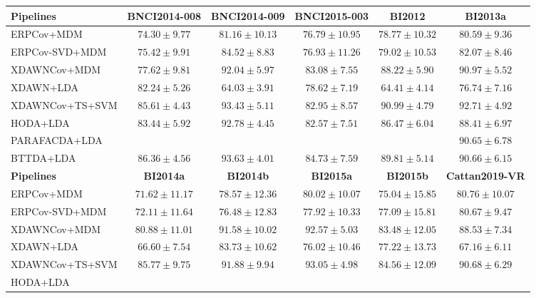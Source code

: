 \begin{tabularx}{\textwidth}{@{}Xccccc@{}}
\toprule
\textbf{Pipelines}            & \textbf{BNCI2014-008} & \textbf{BNCI2014-009}
                              & \textbf{BNCI2015-003} & \textbf{BI2012} &
                              \textbf{BI2013a}\\
\midrule
ERPCov+MDM            & $74.30\pm9.77$ & $81.16\pm10.13$ & $76.79\pm10.95$ &
$78.77\pm10.32$ & $80.59\pm9.36$ \\
ERPCov-SVD+MDM  & $75.42\pm9.91$ & $84.52\pm8.83$ & $76.93\pm11.26$ &
$79.02\pm10.53$ & $82.07\pm8.46$ \\
XDAWNCov+MDM          & $77.62\pm9.81$ & $92.04\pm5.97$ & $83.08\pm7.55$ &
$88.22\pm5.90$ & $90.97\pm5.52$ \\
XDAWN+LDA             & $82.24\pm5.26$ & $64.03\pm3.91$ & $78.62\pm7.19$ &
$64.41\pm4.14$ & $76.74\pm7.16$ \\
XDAWNCov+TS+SVM       & $85.61\pm4.43$ & $93.43\pm5.11$ & $82.95\pm8.57$ &
\boldmath$90.99\pm4.79$ & \boldmath$92.71\pm4.92$\\ \midrule
HODA+LDA                  & $83.44\pm5.92$ & $92.78\pm4.45$ & $82.57\pm7.51$
                          & $86.47\pm6.04$ & $88.41\pm6.97$\\
PARAFACDA+LDA             & & & & & $90.65\pm6.78$ \\
BTTDA+LDA                 & \boldmath$86.36\pm4.56$ & \boldmath$93.63\pm4.01$ &
                          \boldmath$84.73\pm7.59$& $89.81\pm5.14$&
                          $90.66\pm6.15$ \\
\toprule
\textbf{Pipelines} & \textbf{BI2014a} & \textbf{BI2014b} & \textbf{BI2015a} &
\textbf{BI2015b} & \textbf{Cattan2019-VR}\\
\midrule
ERPCov+MDM            & $71.62\pm11.17$ & $78.57\pm12.36$ & $80.02\pm10.07$ &
$75.04\pm15.85$ & $80.76\pm10.07$ \\
ERPCov-SVD+MDM  & $72.11\pm11.64$ & $76.48\pm12.83$ & $77.92\pm10.33$ &
$77.09\pm15.81$ & $80.67\pm9.47$ \\
XDAWNCov+MDM          & $80.88\pm11.01$ & $91.58\pm10.02$ & $92.57\pm5.03$ &
$83.48\pm12.05$ & $88.53\pm7.34$ \\
XDAWN+LDA             & $66.60\pm7.54$ & $83.73\pm10.62$ & $76.02\pm10.46$ &
$77.22\pm13.73$ & $67.16\pm6.11$ \\
XDAWNCov+TS+SVM       & $85.77\pm9.75$ & $91.88\pm9.94$ & $93.05\pm4.98$ &
$84.56\pm12.09$ &$90.68\pm6.29$ \\ \midrule
HODA+LDA                  & & & & &  \\

\end{tabularx}
